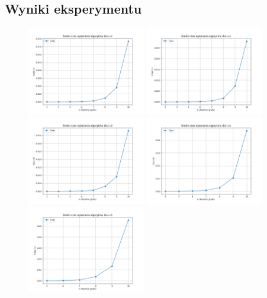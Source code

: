 \documentclass{article}
\begin{document}
\subsection{Wyniki eksperymentu}
\begin{figure}[H]
\centering
\includegraphics[width=0.46\textwidth]{maximumBipartiteMatchingTimePlot1.png}
\includegraphics[width=0.46\textwidth]{maximumBipartiteMatchingTimePlot2.png}
\includegraphics[width=0.46\textwidth]{maximumBipartiteMatchingTimePlot3.png}
\includegraphics[width=0.46\textwidth]{maximumBipartiteMatchingTimePlot4.png}
\includegraphics[width=0.46\textwidth]{maximumBipartiteMatchingTimePlot5.png}

\end{figure}
\end{document}
